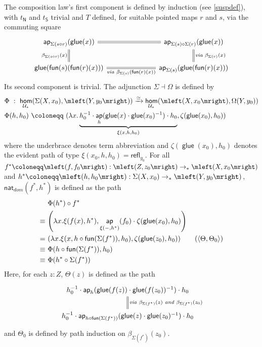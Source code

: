 \documentclass[10pt,a4paper]{article}
\theoremstyle{definition}
\theoremstyle{remark}
\newcommand{\U}{\mathcal{U}}
\newcommand{\dom}{\textit{dom}}
\newcommand{\nat}{\mathsf{nat}}
\newcommand{\refl}{\mathsf{refl}}
\newcommand{\0}{\mathbf{0}}
\newcommand{\1}{\mathbf{1}}
\newcommand{\2}{\mathbf{2}}
\DeclareMathOperator{\ap}{\mathsf{ap}}
\DeclareMathOperator{\glue}{\mathsf{glue}}
\DeclareMathOperator{\homm}{\mathsf{hom}}
\DeclareMathOperator{\fun}{\mathsf{fun}}
\begin{document}
The composition law's first component is defined by induction (see \autoref{suspdef}), with $t_{\mathsf{N}}$ and $t_{\mathsf{S}}$ trivial and $T$ defined, for suitable pointed maps $r$ and $s$, via the commuting square
\[\begin{tikzcd}[column sep = 70]
	{\ap_{\Sigma(s \circ r)}(\glue(x))} & {\ap_{\Sigma(s) \circ  \Sigma(r)}(\glue(x))} \\
	{\glue(\fun(s)(\fun(r)(x)))} & {\ap_{\Sigma(s)}(\glue(\fun(r)(x)))}
	\arrow[equals, from=1-1, to=1-2]
	\arrow["{\beta_{\Sigma(s \circ r)}(x)}"', equals, from=1-1, to=2-1]
	\arrow["{\textit{via $\beta_{\Sigma(r)}(x)$}}", equals, from=1-2, to=2-2]
	\arrow["{\textit{via $\beta_{\Sigma(s)}(\fun(r)(x))$}}"', equals, from=2-1, to=2-2]
\end{tikzcd}\]
Its second component is trivial.
The adjunction $\Sigma \dashv \Omega$ is defined by
\begin{align*}
& \Phi \ : \  \homm_{\U_{\ast}}(\Sigma(X, x_0), \mleft(Y, y_0\mright)) \xrightarrow{\simeq} \homm_{\U_{\ast}}(\mleft(X, x_0\mright), \Omega(Y, y_0))
\\  & \Phi(h, h_0) \ \coloneqq \ (\lambda{x}.\underbrace{h_0^{-1} \cdot \ap_h(\glue(x) \cdot \glue(x_0)^{-1}) \cdot h_0}_{\xi(x,h, h_0)} , \zeta(\glue(x_0), h_0) ) 
\end{align*}
where the underbrace denotes term abbreviation and $\zeta(\glue(x_0), h_0)$ denotes the evident path of type $\xi(x_0,h,h_0)  = \refl_{y_0}$. For all $f^{\ast} \coloneqq \mleft(f, f_0\mright) : \mleft(Z, z_0\mright) \to_{\ast} \mleft(X, x_0\mright)$ and $h^{\ast} \coloneqq \mleft(h, h_0\mright) : \Sigma(X, x_0) \to_{\ast} \mleft(Y, y_0\mright)$, $\nat_{\dom}(f^{\ast}, h^{\ast})$ is defined as the path
\begin{align*}
& \ \Phi(h^{\ast}) \circ  f^{\ast}
\\ \equiv & \ \mleft(\lambda{x}.\xi(f(x), h^{\ast}), \ap_{\xi({-}, h^{\ast})}(f_0) \cdot \zeta(\glue(x_0), h_0)  \mright)
\\ = & \ \mleft(\lambda{x}.\xi(x,h \circ \fun(\Sigma(f^{\ast})), h_0), \zeta(\glue(z_0), h_0)  \mright) \tag{$\mleft\langle{\Theta , \Theta_0}\mright\rangle$}
\\  \equiv & \ \Phi(h \circ \fun(\Sigma(f^{\ast})), h_0) 
\\ \equiv & \ \Phi(h^{\ast} \circ \Sigma(f^{\ast}))
\end{align*}
Here, for each $z : Z$, $\Theta(z)$ is defined as the path
\[\begin{tikzcd}
	{h_0^{-1} \cdot \ap_h(\glue(f(z)) \cdot \glue(f(z_0))^{-1}) \cdot h_0} \\
	{h_0^{-1} \cdot \ap_{h \circ \fun(\Sigma(f^{\ast}))}(\glue(z) \cdot \glue(z_0)^{-1}) \cdot h_0}
	\arrow["{\textit{via $\beta_{\Sigma(f^{\ast})}(z)$ and $\beta_{\Sigma(f^{\ast})}(z_0)$}}", Rightarrow, no head, from=1-1, to=2-1]
\end{tikzcd}\] and $\Theta_0$ is defined by path induction on $\beta_{\Sigma(f^{\ast})}(z_0)$.
\end{document}

